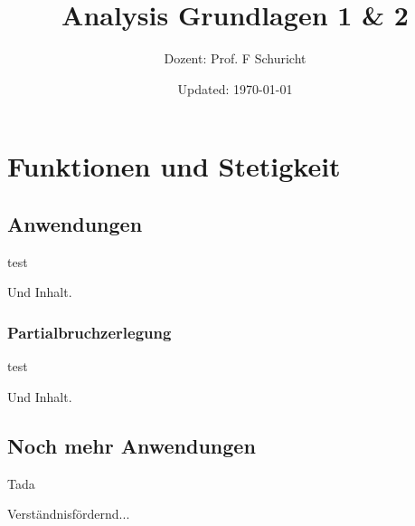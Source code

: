 \documentclass[ngerman,a4paper]{report}
\author{Dozent: Prof. F Schuricht}
\title{Analysis Grundlagen 1 \& 2} %
\date{Updated: \today}
\theoremstyle{break}
\theoremstyle{nonumberbreak}
\renewcommand{\thechapter}{\Roman{chapter}}
\begin{document}
\maketitle
\tableofcontents

\pagebreak
\pagestyle{fancy}
\renewcommand{\chaptermark}[1]{%
	\markboth{\chaptername
		\ \thechapter:\ #1}{}}
\renewcommand{\sectionmark}[1]{%
	\markright{\thesection.\ #1}{}}

\chapter{Funktionen und Stetigkeit}

\section{Anwendungen}

\begin{truetheorem}
    test
\end{truetheorem}

\begin{trueproposition}
    Und Inhalt.
\end{trueproposition}

\subsection{Partialbruchzerlegung}
	
\begin{truetheorem}
	test
\end{truetheorem}
	
\begin{trueproposition}
	Und Inhalt.
\end{trueproposition}

\section{Noch mehr Anwendungen}

\begin{truedefinition}
	Tada
\end{truedefinition}

\begin{trueexample}
	Verständnisfördernd...
\end{trueexample}
\end{document}
